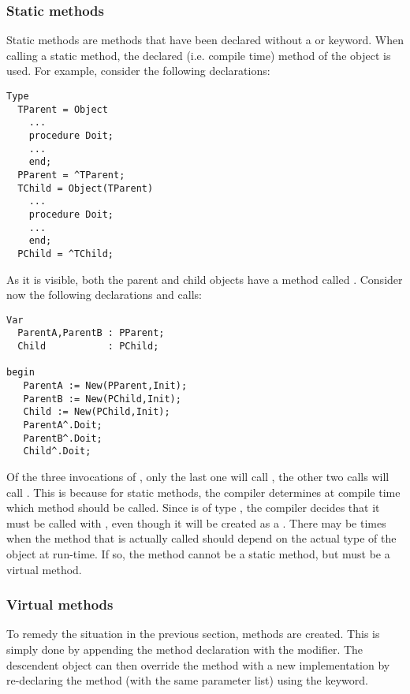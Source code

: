 \subsubsection{Static methods}
Static methods are methods that have been declared without a 
or  keyword. When calling a static method, the declared (i.e.
compile time) method of the object is used.
For example, consider the following declarations:
\begin{verbatim}
Type
  TParent = Object
    ...
    procedure Doit;
    ...
    end;
  PParent = ^TParent;
  TChild = Object(TParent)
    ...
    procedure Doit;
    ...
    end;
  PChild = ^TChild;
\end{verbatim}
As it is visible, both the parent and child objects have a method called
. Consider now the following declarations and calls:
\begin{verbatim}
Var 
  ParentA,ParentB : PParent;
  Child           : PChild;

begin
   ParentA := New(PParent,Init);
   ParentB := New(PChild,Init);
   Child := New(PChild,Init);
   ParentA^.Doit;
   ParentB^.Doit;
   Child^.Doit;
\end{verbatim}
Of the three invocations of , only the last one will call
, the other two calls will call .
This is because for static methods, the compiler determines at compile
time which method should be called. Since  is of type
, the compiler decides that it must be called with
, even though it will be created as a .
There may be times when the method that is actually called should
depend on the actual type of the object at run-time. If so, the method
cannot be a static method, but must be a virtual method.

\subsubsection{Virtual methods}
To remedy the situation in the previous section,  methods are
created. This is simply done by appending the method declaration with the
 modifier. The descendent object can then override the method
with a new implementation by re-declaring the method (with the same
parameter list) using the  keyword.

